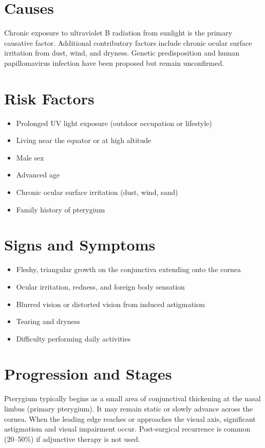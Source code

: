 \section{Causes}
Chronic exposure to ultraviolet B radiation from sunlight is the primary causative factor. Additional contributory factors include chronic ocular surface irritation from dust, wind, and dryness. Genetic predisposition and human papillomavirus infection have been proposed but remain unconfirmed.

\section{Risk Factors}
\begin{itemize}[noitemsep]
  \item Prolonged UV light exposure (outdoor occupation or lifestyle)
  \item Living near the equator or at high altitude
  \item Male sex
  \item Advanced age
  \item Chronic ocular surface irritation (dust, wind, sand)
  \item Family history of pterygium
\end{itemize}

\section{Signs and Symptoms}
\begin{itemize}[noitemsep]
  \item Fleshy, triangular growth on the conjunctiva extending onto the cornea
  \item Ocular irritation, redness, and foreign body sensation
  \item Blurred vision or distorted vision from induced astigmatism
  \item Tearing and dryness
  \item Difficulty performing daily activities
\end{itemize}

\section{Progression and Stages}
Pterygium typically begins as a small area of conjunctival thickening at the nasal limbus (primary pterygium). It may remain static or slowly advance across the cornea. When the leading edge reaches or approaches the visual axis, significant astigmatism and visual impairment occur. Post-surgical recurrence is common (20--50\%) if adjunctive therapy is not used.

